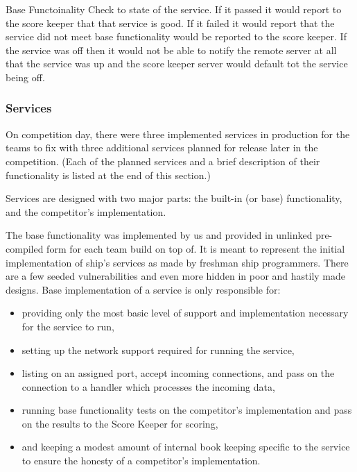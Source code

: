 \documentclass[10pt]{article}
\begin{document}
Base Functoinality 
Check to state of the service.
If it passed it would report to the score keeper that that service is good.
If it failed it would report that the service did not meet base functionality would
be reported to the score keeper.
If the service was off then it would not be able to notify the remote server at all
that the service was up and the score keeper server would default tot the service
being off.

\subsubsection{Services}
\label{stservices}
On competition day, there were three implemented services in production for the
teams to fix with three additional services planned for release later in the
competition. (Each of the planned services and a brief description of their
functionality is listed at the end of this section.)

Services are designed with two major parts: the built-in (or base)
functionality, and the competitor's implementation.

The base functionality was implemented by us and provided in unlinked
pre-compiled form for each team build on top of. It is meant to represent the
initial implementation of ship's services as made by freshman ship programmers.
There are a few seeded vulnerabilities and even more hidden in poor and hastily
made designs. Base implementation of a service is only responsible for:

\begin{itemize}
    \item providing only the most basic level of support and implementation
    necessary for the service to run, 
    \item setting up the network support required for running the service,
    \item listing on an assigned port, accept incoming connections, and pass on
    the connection to a handler which processes the incoming data,
    \item running base functionality tests on the competitor's implementation and
    pass on the results to the Score Keeper for scoring,
    \item and keeping a modest amount of internal book keeping specific to the
    service to ensure the honesty of a competitor's implementation.
\end{itemize}
\end{document}
